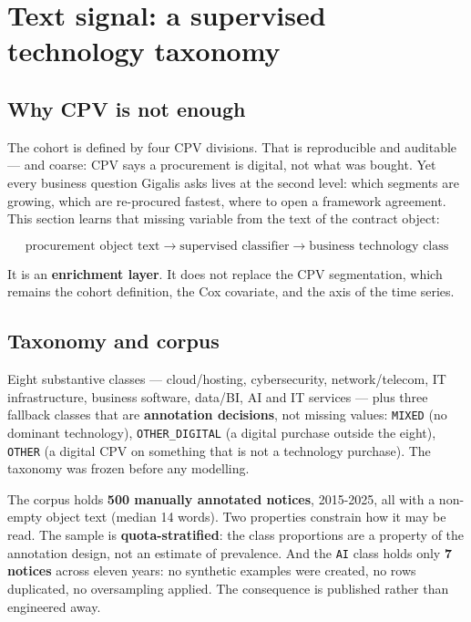 \section{Text signal: a supervised technology taxonomy}

\subsection{Why CPV is not enough}

The cohort is defined by four CPV divisions. That is reproducible and auditable --- and coarse: CPV says a procurement is digital, not what was bought. Yet every business question Gigalis asks lives at the second level: which segments are growing, which are re-procured fastest, where to open a framework agreement. This section learns that missing variable from the text of the contract object:

\[\text{procurement object text} \longrightarrow \text{supervised classifier} \longrightarrow \text{business technology class}\]

It is an \textbf{enrichment layer}. It does not replace the CPV segmentation, which remains the cohort definition, the Cox covariate, and the axis of the time series.

\subsection{Taxonomy and corpus}

Eight substantive classes --- cloud/hosting, cybersecurity, network/telecom, IT infrastructure, business software, data/BI, AI and IT services --- plus three fallback classes that are \textbf{annotation decisions}, not missing values: \texttt{MIXED} (no dominant technology), \texttt{OTHER\_DIGITAL} (a digital purchase outside the eight), \texttt{OTHER} (a digital CPV on something that is not a technology purchase). The taxonomy was frozen before any modelling.

The corpus holds \textbf{500 manually annotated notices}, 2015-2025, all with a non-empty object text (median 14 words). Two properties constrain how it may be read. The sample is \textbf{quota-stratified}: the class proportions are a property of the annotation design, not an estimate of prevalence. And the \texttt{AI} class holds only \textbf{7 notices} across eleven years: no synthetic examples were created, no rows duplicated, no oversampling applied. The consequence is published rather than engineered away.

